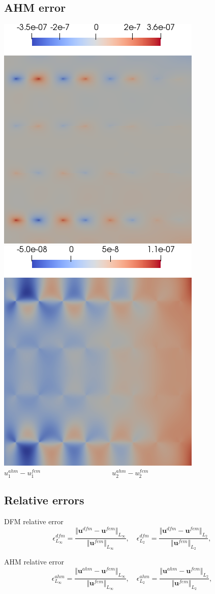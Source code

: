 \documentclass[compress,pdf,mathserif]{beamer}
\begin{document}
\subsection{AHM error}
\begin{frame}
    \centering
    \includegraphics[width=0.45\linewidth]{data/eax.png} \hspace{1em}
    \includegraphics[width=0.45\linewidth]{data/eay.png} \\
    $u_1^{ahm}-u_1^{fem} \hspace{10em} u_2^{ahm}-u_2^{fem}$
\end{frame}

\subsection{Relative errors}
\begin{frame}
    \centering 
    DFM relative error        
    \[
        \epsilon^{dfm}_{L_\infty} = \frac{\Vert \bm{u}^{dfm} - \bm{u}^{fem} \Vert_{L_\infty}}{\Vert \bm{u}^{fem} \Vert_{L_\infty}}, \quad
    \epsilon^{dfm}_{L_2} = \frac{\Vert \bm{u}^{dfm} - \bm{u}^{fem} \Vert_{L_2}}{\Vert \bm{u}^{fem} \Vert_{L_2}},     
    \]
    \vspace{1em}

    AHM relative error
    \[
        \epsilon^{ahm}_{L_\infty} = \frac{\Vert \bm{u}^{ahm} - \bm{u}^{fem} \Vert_{L_\infty}}{\Vert \bm{u}^{fem} \Vert_{L_\infty}}, \quad
        \epsilon^{ahm}_{L_2} = \frac{\Vert \bm{u}^{ahm} - \bm{u}^{fem} \Vert_{L_2}}{\Vert \bm{u}^{fem} \Vert_{L_2}},     \]
\end{frame}
\end{document}
